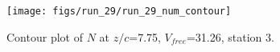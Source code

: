 \begin{figure}[H]
\centering
\texttt{[image: figs/run\_29/run\_29\_num\_contour]}
\caption{Contour plot of $N$ at $z/c$=7.75, $V_{free}$=31.26, station 3.}
\label{fig:run_29_num_contour}
\end{figure}


